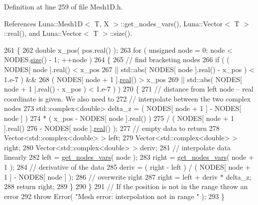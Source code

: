 Definition at line 259 of file Mesh1\+D.\+h.



References Luna\+::\+Mesh1\+D$<$ T, X $>$\+::get\+\_\+nodes\+\_\+vars(), Luna\+::\+Vector$<$ T $>$\+::real(), and Luna\+::\+Vector$<$ T $>$\+::size().


\begin{DoxyCode}
261   \{
262     \textcolor{keywordtype}{double} x\_pos( pos.real() );
263     \textcolor{keywordflow}{for} ( \textcolor{keywordtype}{unsigned} node = 0; node < NODES.\hyperlink{classLuna_1_1Vector_ac9b6ed7a0df401728f27c193fbc8f4d8}{size}() - 1; ++node )
264     \{
265       \textcolor{comment}{// find bracketing nodes}
266       \textcolor{keywordflow}{if} ( ( NODES[ node ].real() < x\_pos
267         || std::abs( NODES[ node ].real() - x\_pos ) < 1.e-7 ) &&
268            ( NODES[ node + 1 ].\hyperlink{classLuna_1_1Vector_a39fa58d9f5fdca76b6ffa6cc481f9284}{real}() > x\_pos
269         || std::abs( NODES[ node + 1 ].real() - x\_pos ) < 1.e-7 ) )
270       \{
271         \textcolor{comment}{// distance from left node -- real coordinate is given. We also need to}
272         \textcolor{comment}{// interpolate between the two complex nodes}
273         std::complex<double> delta\_z = ( NODES[ node + 1 ] - NODES[ node ] )
274                                        * ( x\_pos - NODES[ node ].real() )
275                                        / ( NODES[ node + 1 ].real()
276                                          - NODES[ node ].\hyperlink{classLuna_1_1Vector_a39fa58d9f5fdca76b6ffa6cc481f9284}{real}() );
277         \textcolor{comment}{// empty data to return}
278         Vector<std::complex<double> > left;
279         Vector<std::complex<double> > right;
280         Vector<std::complex<double> > deriv;
281         \textcolor{comment}{// interpolate data linearly}
282         left = \hyperlink{classLuna_1_1Mesh1D_ac26360c5d246da376ebdcaa9fab05e81}{get\_nodes\_vars}( node );
283         right = \hyperlink{classLuna_1_1Mesh1D_ac26360c5d246da376ebdcaa9fab05e81}{get\_nodes\_vars}( node + 1 );
284         \textcolor{comment}{// derivative of the data}
285         deriv = ( right - left ) / ( NODES[ node + 1 ] - NODES[ node ] );
286         \textcolor{comment}{// overwrite right}
287         right = left + deriv * delta\_z;
288         \textcolor{keywordflow}{return} right;
289       \}
290     \}
291     \textcolor{comment}{// If the position is not in the range throw an error}
292     \textcolor{keywordflow}{throw} Error( \textcolor{stringliteral}{"Mesh error: interpolation not in range "} );
293   \}
\end{DoxyCode}
\mbox{\label{classLuna_1_1Mesh1D_ac26360c5d246da376ebdcaa9fab05e81}} 

